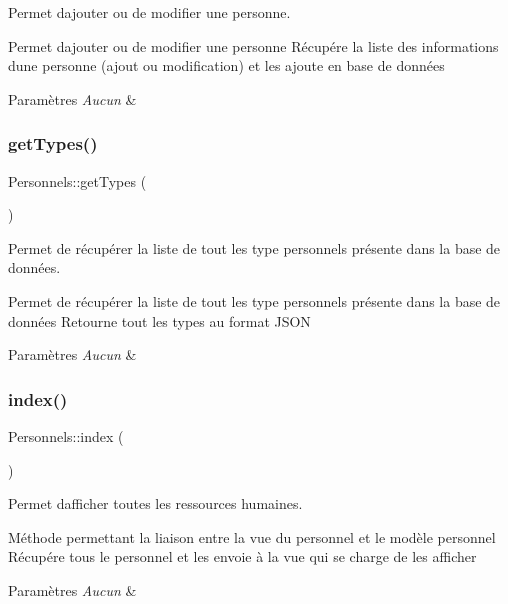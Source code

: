 Permet d\textquotesingle{}ajouter ou de modifier une personne. 

Permet d\textquotesingle{}ajouter ou de modifier une personne Récupére la liste des informations d\textquotesingle{}une personne (ajout ou modification) et les ajoute en base de données 
\begin{DoxyParams}{Paramètres}
{\em Aucun} & \\
\hline
\end{DoxyParams}
\mbox{\label{class_personnels_ad260f97073aa7af9cc1e966ed9e0ca13}} 
\subsubsection{\texorpdfstring{get\+Types()}{getTypes()}}
{\footnotesize\ttfamily Personnels\+::get\+Types (\begin{DoxyParamCaption}{ }\end{DoxyParamCaption})}



Permet de récupérer la liste de tout les type personnels présente dans la base de données. 

Permet de récupérer la liste de tout les type personnels présente dans la base de données Retourne tout les types au format J\+S\+ON 
\begin{DoxyParams}{Paramètres}
{\em Aucun} & \\
\hline
\end{DoxyParams}
\mbox{\label{class_personnels_a0b50be758dae7b0ea804936577b06357}} 
\subsubsection{\texorpdfstring{index()}{index()}}
{\footnotesize\ttfamily Personnels\+::index (\begin{DoxyParamCaption}{ }\end{DoxyParamCaption})}



Permet d\textquotesingle{}afficher toutes les ressources humaines. 

Méthode permettant la liaison entre la vue du personnel et le modèle personnel Récupére tous le personnel et les envoie à la vue qui se charge de les afficher 
\begin{DoxyParams}{Paramètres}
{\em Aucun} & \\
\hline
\end{DoxyParams}
\mbox{\label{class_personnels_a2b1fee34642a3fc87dfce046a00eb4a2}} 
